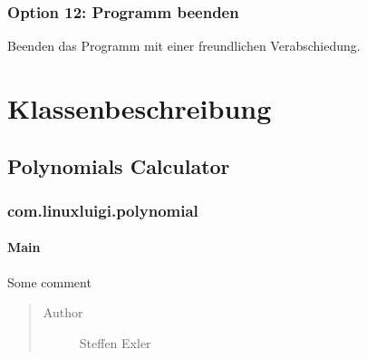 \documentclass[letterpaper,10pt,ngerman]{sphinxmanual}
\begin{document}


\subsection{Option 12: Programm beenden}
\label{menu:option-12-programm-beenden}
Beenden das Programm mit einer freundlichen Verabschiedung.



\chapter{Klassenbeschreibung}
\label{index:klassenbeschreibung}

\section{Polynomials Calculator}
\label{packages:polynomials-calculator}\label{packages::doc}

\subsection{com.linuxluigi.polynomial}
\label{com/linuxluigi/polynomial/package-index::doc}\label{com/linuxluigi/polynomial/package-index:com-linuxluigi-polynomial}\label{com/linuxluigi/polynomial/package-index:package-com.linuxluigi.polynomial}

\subsubsection{Main}
\label{com/linuxluigi/polynomial/Main:main}\label{com/linuxluigi/polynomial/Main::doc}

\begin{fulllineitems}
\label{com/linuxluigi/polynomial/Main:com.linuxluigi.polynomial.Main}
Some comment
\begin{quote}\begin{description}
\item[{Author}] \leavevmode
Steffen Exler

\end{description}\end{quote}

\end{fulllineitems}
\end{document}
